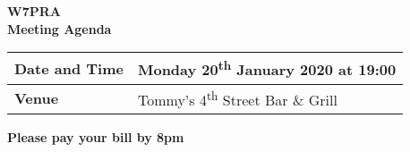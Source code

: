 \documentclass[letter,11pt]{extarticle}
\begin{document}
	\thispagestyle{empty}
	
	\begin{center}
		\textbf{W7PRA\\Meeting Agenda}
		\vspace{0.33cm}
	\end{center}
	
	\begin{center}
		\begin{tabular}{| m{3.0cm} | m{7.5cm} |} \hline
			\textbf{Date and Time} & Monday 20\textsuperscript{th} January 2020 at 19:00 \\ \hline
			\textbf{Venue} & Tommy's 4\textsuperscript{th} Street Bar \& Grill \\ \hline
		\end{tabular}
	\end{center}
	
	\begin{center}
		\textbf{Please pay your bill by 8pm}
	\end{center}
	
\end{document}
